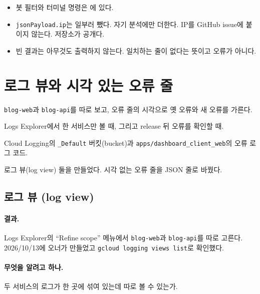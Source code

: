\begin{itemize}[nosep]
  \item 봇 필터와 터미널 명령은 에 있다.
  \item \texttt{jsonPayload.ip}는 일부러 뺐다. 자기 분석에만 더한다. IP를 GitHub issue에 붙이지 않는다. 저장소가 공개다.
  \item 빈 결과는 아무것도 출력하지 않는다. 일치하는 줄이 없다는 뜻이고 오류가 아니다.
\end{itemize}

\section{로그 뷰와 시각 있는 오류 줄}\label{sec:06-views}

\begin{inbrief}
  \item[Why] \texttt{blog-web}과 \texttt{blog-api}를 따로 보고, 오류 줄의 시각으로 옛 오류와 새 오류를 가른다.
  \item[When] Logs Explorer에서 한 서비스만 볼 때, 그리고 release 뒤 오류를 확인할 때.
  \item[Where] Cloud Logging의 \texttt{\_Default} 버킷(bucket)과 \texttt{apps/dashboard\_client\_web}의 오류 로그 코드.
  \item[How] 로그 뷰(log view) 둘을 만들었다. 시각 없는 오류 줄을 JSON 줄로 바꿨다.
\end{inbrief}

\subsection{로그 뷰 (log view)}\label{sec:06-logviews}

\paragraph{결과.}
Logs Explorer의 ``Refine scope'' 메뉴에서 \texttt{blog-web}과 \texttt{blog-api}를 따로 고른다.
2026/10/13에 오너가 만들었고 \texttt{gcloud logging views list}로 확인했다.

\paragraph{무엇을 알려고 하나.}
두 서비스의 로그가 한 곳에 섞여 있는데 따로 볼 수 있는가.

